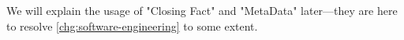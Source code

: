 
We will explain the usage of "Closing Fact" and "MetaData" later---they are here to resolve \ref{chg:software-engineering} to some extent.
